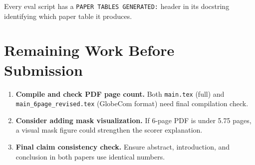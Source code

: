 \documentclass[11pt]{article}
\begin{document}
Every eval script has a \texttt{PAPER TABLES GENERATED:} header in its docstring identifying which paper table it produces.

\section{Remaining Work Before Submission}

\begin{enumerate}
    \item \textbf{Compile and check PDF page count.} Both \texttt{main.tex} (full) and \texttt{main\_6page\_revised.tex} (GlobeCom format) need final compilation check.
    \item \textbf{Consider adding mask visualization.} If 6-page PDF is under 5.75 pages, a visual mask figure could strengthen the scorer explanation.
    \item \textbf{Final claim consistency check.} Ensure abstract, introduction, and conclusion in both papers use identical numbers.
\end{enumerate}
\end{document}
